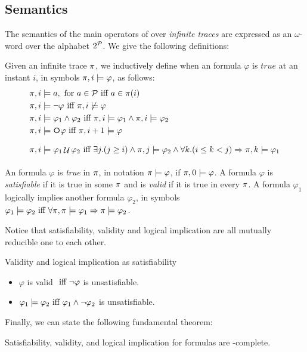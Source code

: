 \subsection{Semantics}
The semantics of the main operators of \LTL over \textit{infinite traces} are expressed as an $\omega$-word over the alphabet $2^\P$. We give the following definitions:
\begin{definition}\label{ltl-semantics}
	Given an infinite trace $\trace$, we inductively define when an \LTL formula $\varphi$ is $true$ at an instant $i$, in symbols $\trace, i \models \varphi$, as follows:
	\begin{align*}
	\trace, i &\models a, \tm{for} a\in\P \tiff a \in \trace(i)\\
	\trace, i &\models \lnot \varphi \tiff \trace, i \not\models \varphi\\
	\trace, i &\models \varphi_1 \lAND \varphi_2 \tiff \trace, i \models \varphi_1 \lAND \trace, i \models \varphi_2\\
	\trace, i &\models \Next\varphi \tiff \trace,i+1 \models \varphi\\
	\trace, i &\models \varphi_1 \lUntil \varphi_2 \tiff \exists j. (j\ge i) \lAND \trace,j \models \varphi_2 \lAND\forall k. (i\le k < j) \Rightarrow \trace, k \models \varphi_1\\
	\end{align*}
\end{definition}
\begin{definition}\label{ltl-sat-val-ent}
An \LTL formula $\varphi$ is \emph{true} in $\trace$, in notation $\trace \models \varphi$, if $\trace, 0 \models \varphi$. A formula $\varphi$ is \emph{satisfiable} if it is true in some $\trace$ and is \emph{valid} if it is true in every $\trace$. A formula $\varphi_1$ logically implies another formula $\varphi_2$, in symbols $\varphi_1 \models \varphi_2 \tiff \forall \trace, \trace \models \varphi_1 \Rightarrow \trace \models \varphi_2$.
\end{definition}
Notice that satisfiability, validity and logical implication are all mutually reducible one to each other.
\begin{example}\label{ltl-sat-examples}
Validity and logical implication as satisfiability
\begin{itemize}
\item $\varphi$ is valid $\tiff \lnot \varphi$ is unsatisfiable.
\item $\varphi_1 \models \varphi_2 \tiff \varphi_1 \lAND \lnot \varphi_2$ is unsatisfiable.
\end{itemize}
\end{example}
Finally, we can state the following fundamental theorem:
\begin{theorem}
Satisfiability, validity, and logical implication for \LTL formulas are \PSPACE-complete.
\end{theorem}
